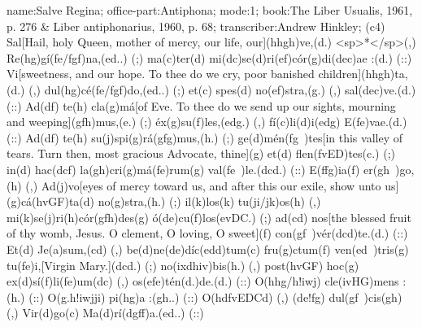 name:Salve Regina;
office-part:Antiphona;
mode:1;
book:The Liber Usualis, 1961, p. 276 & Liber antiphonarius, 1960, p. 68;
transcriber:Andrew Hinkley;
(c4) Sal[Hail, holy Queen, mother of mercy, our life, our](hhgh)ve,(d.) <sp>*</sp>(,) Re(hg)gí(fe/fgf)na,(ed..) (;) ma(c)ter(d) mi(dc)se(d)ri(ef)cór(g)di(dec)ae :(d.) (::) Vi[sweetness, and our hope. To thee do we cry, poor banished children](hhgh)ta,(d.) (,) dul(hg)cé(fe/fgf)do,(ed..) (;) et(c) spes(d) no(ef)stra,(g.) (,) sal(dec)ve.(d.) (::) Ad(df) te(h) cla(g)má[of Eve. To thee do we send up our sights, mourning and weeping](gfh)mus,(e.) (;) éx(g)su(f)les,(edg.) (,) fí(c)li(d)i(edg) E(fe)vae.(d.) (::) Ad(df) te(h) su(j)spi(g)rá(gfg)mus,(h.) (;) ge(d)mén(fg~)tes[in this valley of tears. Turn then, most gracious Advocate, thine](g) et(d) flen(fvED)tes(c.) (;) in(d) hac(dcf) la(gh)cri(g)má(fe)rum(g) val(fe~)le.(dcd.) (::) E(ffg)ia(f) er(gh~)go,(h) (,) Ad(j)vo[eyes of mercy toward us, and after this our exile, show unto us](g)cá(hvGF)ta(d) no(g)stra,(h.) (;) il(k)los(k) tu(ji/jk)os(h) (,) mi(k)se(j)ri(h)cór(gfh)des(g) ó(de)cu(f)los(evDC.) (;) ad(cd) nos[the blessed fruit of thy womb, Jesus. O clement, O loving, O sweet](f) con(gf~)vér(dcd)te.(d.) (::) Et(d) Je(a)sum,(cd) (,) be(d)ne(de)díc(edd)tum(c) fru(g)ctum(f) ven(ed~)tris(g) tu(fe)i,[Virgin Mary.](dcd.) (;) no(ixdhiv)bis(h.) (,) post(hvGF) hoc(g) ex(d)sí(f)li(fe)um(dc) (,) os(efe)tén(d.)de.(d.) (::) O(hhg/h!iwj) cle(ivHG)mens :(h.) (::) O(g.h!iwjji) pi(hg)a :(gh..) (::) O(hdfvEDCd) (,) (de!fg) dul(gf~)cis(gh) (,) Vir(d)go(c) Ma(d)rí(dgff)a.(ed..) (::)